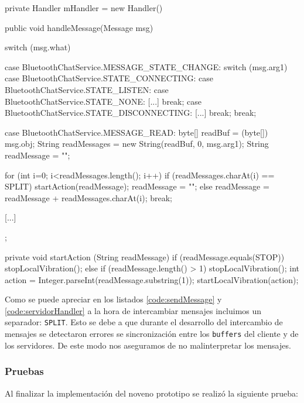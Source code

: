 \begin{listing}[
  float=ht,
  language = java,
  caption  = {Métodos utilizados en los servidores para leer los mensajes recibidos por medio de de
               la clase \texttt{BluetoothChatServide} },
  label    = code:servidorHandler]
private Handler mHandler = new Handler() {
  public void handleMessage(Message msg) {
    switch (msg.what) {
      case BluetoothChatService.MESSAGE_STATE_CHANGE:
        switch (msg.arg1) {
          case BluetoothChatService.STATE_CONNECTING:
          case BluetoothChatService.STATE_LISTEN:
          case BluetoothChatService.STATE_NONE:
            [...]
            break;
          case  BluetoothChatService.STATE_DISCONNECTING:
            [...]
            break;
        }
        break;

      case BluetoothChatService.MESSAGE_READ:
        byte[] readBuf = (byte[]) msg.obj;
        String readMessages = new String(readBuf, 0, msg.arg1);
        String readMessage = "";
                
        for (int i=0; i<readMessages.length(); i++) {
          if (readMessages.charAt(i) == SPLIT) {
            startAction(readMessage);
            readMessage = "";
          } else {
            readMessage = readMessage + readMessages.charAt(i);
          }
        }
        break;

      [...]
    }
  }
};

private void startAction (String readMessage) {
  if (readMessage.equals(STOP)) {
    stopLocalVibration();
  } else if (readMessage.length() > 1) {
    stopLocalVibration();
    int action = Integer.parseInt(readMessage.substring(1));
    startLocalVibration(action);
  }
}
\end{listing}

Como se puede apreciar en los listados \ref{code:sendMessage} y \ref{code:servidorHandler} a la hora
de intercambiar mensajes incluimos un separador: \texttt{SPLIT}. Esto se debe a que durante el
desarrollo del intercambio de mensajes se detectaron errores se sincronización entre los
\texttt{buffers} del cliente y de los servidores. De este modo nos aseguramos de no malinterpretar
los mensajes.

\subsubsection{Pruebas}

Al finalizar la implementación del noveno prototipo se realizó la siguiente prueba:


